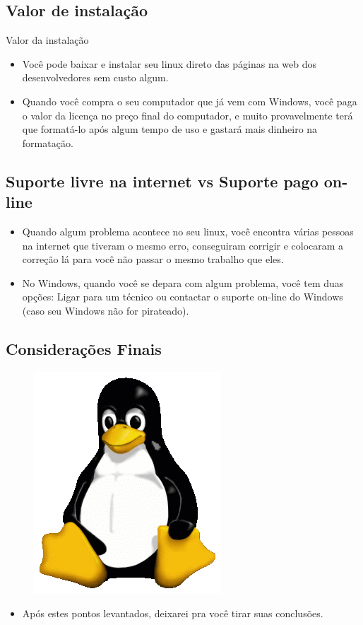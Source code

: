 \documentclass{beamer}
\begin{document}
\subsection{Valor de instalação}
\begin{frame}{Valor da instalação}
    \begin{itemize}
        \item{Você pode baixar e instalar seu linux direto das páginas na web dos desenvolvedores sem custo algum.}
\item{Quando você compra o seu computador que já vem com Windows, você paga o valor da licença no preço final do computador, e muito provavelmente terá que formatá-lo após algum tempo de uso e gastará mais dinheiro na formatação.}
    \end{itemize}
\end{frame}


\subsection{Suporte livre na internet vs Suporte pago on-line}
\begin{frame} 
\begin{itemize}
        \item{Quando algum problema acontece no seu linux, você encontra várias pessoas na internet que tiveram o mesmo erro, conseguiram corrigir e colocaram a correção lá para você não passar o mesmo trabalho que eles.}
\item{No Windows, quando você se depara com algum problema, você tem duas opções: Ligar para um técnico ou contactar o suporte on-line do Windows (caso seu Windows não for pirateado).}
    \end{itemize}
\end{frame}

\subsection{Considerações Finais}
\begin{frame} 
\begin{figure}[h!]
        \centering
        \includegraphics[scale=0.3]{Tux.png}
    \end{figure}
\begin{itemize}
\item{Após estes pontos levantados, deixarei pra você tirar suas conclusões.}
    \end{itemize}
\end{frame}
\end{document}
